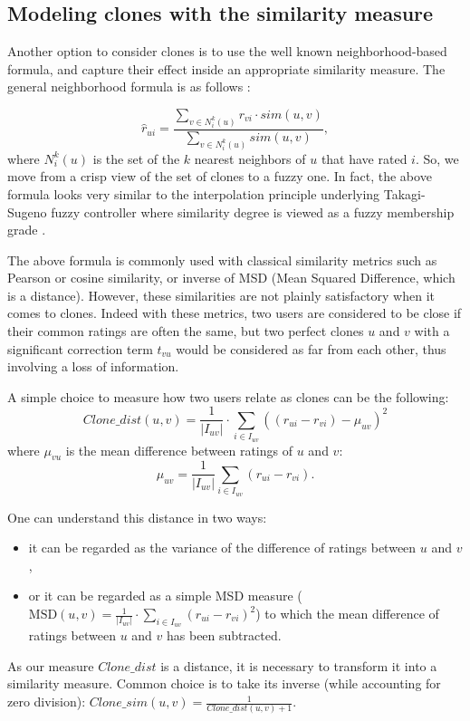 \documentclass[conference]{IEEEtran}
\newcommand{\predr}[1]{\hat{r}_{#1}}
\begin{document}
\subsection{Modeling clones with the similarity measure}
\label{MODELING_CLONES}
Another option to consider clones is to use the well known neighborhood-based
formula, and capture their effect inside an appropriate similarity measure. The
general neighborhood formula is as follows \cite{handbookRecoSys2011}:

$$\predr{ui} = \frac{\sum_{v \in N_i^k(u)} r_{vi} \cdot sim(u, v)}{\sum_{v \in
  N_i^k(u)} sim(u, v)},$$
where $N_i^k(u)$ is the set of the $k$ nearest neighbors of $u$ that have rated
$i$. So, we move from a crisp view of the set of clones to a fuzzy one. In fact, the above formula looks very similar to the interpolation principle underlying Takagi-Sugeno fuzzy controller where similarity degree is viewed as a fuzzy membership grade \cite{TS85}.

The above formula is commonly used with classical similarity metrics such as
Pearson or cosine similarity, or inverse of MSD (Mean Squared Difference, which is
a distance).
However, these similarities are not plainly satisfactory when it comes to
clones. Indeed with these metrics, two users are considered to be close if
their common ratings are often the same, but two perfect clones $u$ and $v$
with a significant correction term $t_{vu}$ would be considered as far from
each other, thus involving a loss of information.

A simple choice to measure how two users relate as clones can be the following:
$$Clone\_dist(u, v) =  \frac{1}{|I_{uv}|} \cdot \sum\limits_{i \in I_{uv}}
((r_{ui} - r_{vi}) - \mu_{uv})^2$$
where $\mu_{vu}$ is the mean difference between ratings of $u$ and $v$:
$$\mu_{uv}= \frac{1}{|I_{uv}|}\sum_{i \in I_{uv}} (r_{ui} - r_{vi}).$$

One can understand this distance in two ways:
\begin{itemize}
\item it can be regarded as the variance of the difference of ratings between
  $u$ and $v$,
\item or it can be regarded as a simple MSD measure ($\text{MSD}(u, v) =
  \frac{1}{|I_{uv}|} \cdot \sum\limits_{i \in I_{uv}}
  (r_{ui} - r_{vi})^2$)
 to which the mean difference of ratings between $u$ and $v$ has been
 subtracted.
  \end{itemize}

As our measure $Clone\_dist$ is a distance, it is necessary to transform it
into a similarity measure. Common choice is to take its inverse (while accounting for zero division): $Clone\_sim(u,
v) = \frac{1}{Clone\_dist(u, v) + 1}$.
\end{document}
